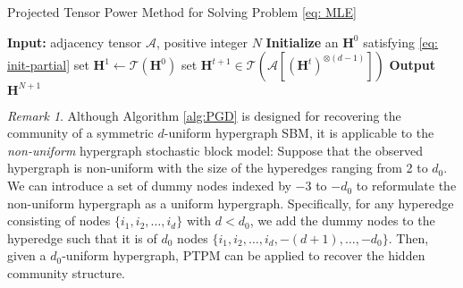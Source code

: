 \documentclass{article}
\theoremstyle{plain}
\theoremstyle{definition}
\theoremstyle{remark}
\newtheorem{remark}[theorem]{Remark}
\newcommand{\BH}{\bm{H}}
\newcommand{\TCal}{\mathcal{T}}
\newcommand{\ACal}{\mathcal{A}}
\begin{document}
\begin{algorithm}[!htbp]
	\caption{Projected Tensor Power Method for Solving Problem \eqref{eq: MLE}}  
	\begin{algorithmic}[1]  
		\STATE \textbf{Input:} adjacency tensor $\ACal$, positive integer $N$
		\STATE \textbf{Initialize} an $\BH^0$ satisfying \eqref{eq: init-partial} 
		\STATE set $\BH^1 \leftarrow \TCal(\BH^0)$ 		
		\STATE set $\BH^{t+1} \in \TCal \left(\ACal\left[ \left(\bm{H}^{t} \right)^{\otimes (d-1)}\right] \right)$
		\ENDFOR
		\STATE \textbf{Output} $\BH^{N+1}$
	\end{algorithmic}
	\label{alg:PGD}
\end{algorithm}
\begin{remark}\label{rmk:non-uniform}
    Although Algorithm \ref{alg:PGD} is designed for recovering the community of a symmetric $d$-uniform hypergraph SBM, it is applicable to the \emph{non-uniform} hypergraph stochastic block model: Suppose that the observed hypergraph is non-uniform with the size of the hyperedges ranging from 2 to $d_0$. We can introduce a set of dummy nodes indexed by $-3$ to $-d_0$ to reformulate the non-uniform hypergraph as a uniform hypergraph. Specifically, for any hyperedge consisting of nodes $\{i_1,i_2,\dots,i_d \}$ with $d < d_0$, we add the dummy nodes to the hyperedge such that it is of $d_0$ nodes $\{i_1,i_2,\dots,i_d, -(d+1),\dots,-d_0\}$. Then, given a $d_0$-uniform hypergraph, PTPM can be applied to recover the hidden community structure.
\end{remark}
\end{document}
